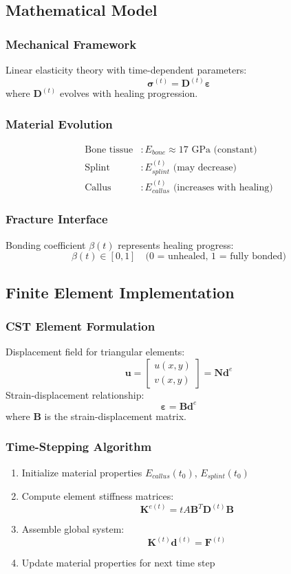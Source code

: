\documentclass{article}
\begin{document}
\subsection{Mathematical Model}
\subsubsection{Mechanical Framework}
Linear elasticity theory with time-dependent parameters:
\[
\bm{\sigma}^{(t)} = \mathbf{D}^{(t)}\bm{\varepsilon}
\]
where $\mathbf{D}^{(t)}$ evolves with healing progression.
\subsubsection{Material Evolution}
\begin{align*}
\text{Bone tissue} &: E_{bone} \approx 17 \text{ GPa (constant)} \\
\text{Splint} &: E_{splint}^{(t)} \text{ (may decrease)} \\
\text{Callus} &: E_{callus}^{(t)} \text{ (increases with healing)}
\end{align*}
\subsubsection{Fracture Interface}
Bonding coefficient $\beta(t)$ represents healing progress:
\[
\beta(t) \in [0,1] \quad \text{(0 = unhealed, 1 = fully bonded)}
\]
\subsection{Finite Element Implementation}
\subsubsection{CST Element Formulation}
Displacement field for triangular elements:
\[
\mathbf{u} = \begin{bmatrix} u(x,y) \\ v(x,y) \end{bmatrix} = \mathbf{N}\mathbf{d}^e
\]
Strain-displacement relationship:
\[
\bm{\varepsilon} = \mathbf{B}\mathbf{d}^e
\]
where $\mathbf{B}$ is the strain-displacement matrix.
\subsubsection{Time-Stepping Algorithm}
\begin{enumerate}
  \item Initialize material properties $E_{callus}(t_0)$, $E_{splint}(t_0)$
  \item Compute element stiffness matrices:
  \[
  \mathbf{K}^{e(t)} = tA\mathbf{B}^T\mathbf{D}^{(t)}\mathbf{B}
  \]
  \item Assemble global system:
  \[
  \mathbf{K}^{(t)}\mathbf{d}^{(t)} = \mathbf{F}^{(t)}
  \]
  \item Update material properties for next time step
\end{enumerate}
\end{document}

